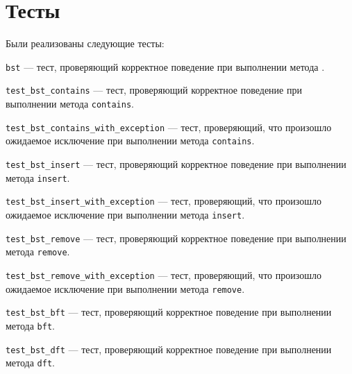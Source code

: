 \section*{Тесты}

Были реализованы следующие тесты:

\verb|bst| --- тест, проверяющий корректное поведение при выполнении метода \verb||.

\verb|test_bst_contains| --- тест, проверяющий корректное поведение при выполнении метода \verb|contains|.

\verb|test_bst_contains_with_exception| --- тест, проверяющий, что произошло ожидаемое исключение при выполнении метода \verb|contains|.

\verb|test_bst_insert| --- тест, проверяющий корректное поведение при выполнении метода \verb|insert|.

\verb|test_bst_insert_with_exception| --- тест, проверяющий, что произошло ожидаемое исключение при выполнении метода \verb|insert|.

\verb|test_bst_remove| --- тест, проверяющий корректное поведение при выполнении метода \verb|remove|.

\verb|test_bst_remove_with_exception| --- тест, проверяющий, что произошло ожидаемое исключение при выполнении метода \verb|remove|.

\verb|test_bst_bft| --- тест, проверяющий корректное поведение при выполнении метода \verb|bft|.

\verb|test_bst_dft| --- тест, проверяющий корректное поведение при выполнении метода \verb|dft|.
